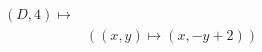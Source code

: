 \documentclass[preview]{standalone}
\begin{document}
\begin{align*}
(D,4) \mapsto &\\&( (x,y) \mapsto (x, -y + 2))
\end{align*}
\end{document}

